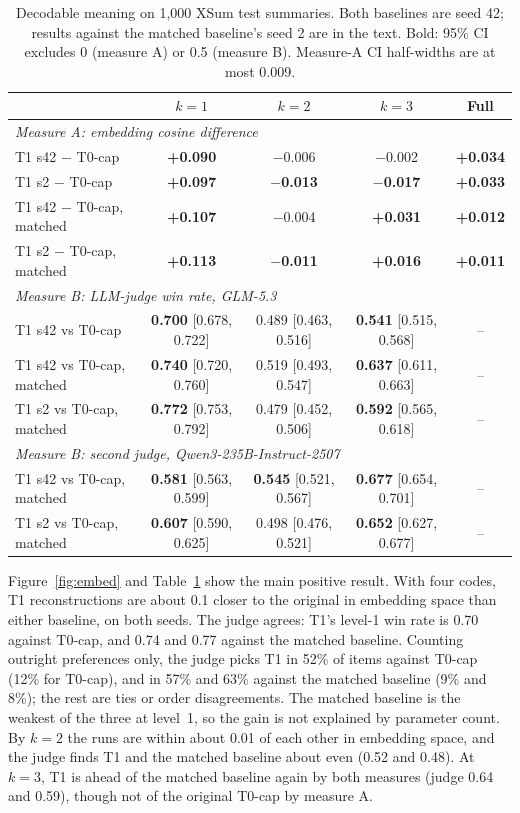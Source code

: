 \documentclass[11pt]{article}
\newcommand{\pos}[1]{\textbf{#1}}
\begin{document}
\begin{table}[t]
\centering
\footnotesize
\begin{tabular}{lcccc}
\toprule
& $k{=}1$ & $k{=}2$ & $k{=}3$ & Full \\
\midrule
\multicolumn{5}{l}{\emph{Measure A: embedding cosine difference}} \\
T1 s42 $-$ T0-cap & \pos{+0.090} & $-$0.006 & $-$0.002 & \pos{+0.034} \\
T1 s2 $-$ T0-cap & \pos{+0.097} & \pos{$-$0.013} & \pos{$-$0.017} & \pos{+0.033} \\
T1 s42 $-$ T0-cap, matched & \pos{+0.107} & $-$0.004 & \pos{+0.031} & \pos{+0.012} \\
T1 s2 $-$ T0-cap, matched & \pos{+0.113} & \pos{$-$0.011} & \pos{+0.016} & \pos{+0.011} \\
\midrule
\multicolumn{5}{l}{\emph{Measure B: LLM-judge win rate, GLM-5.3}} \\
T1 s42 vs T0-cap & \pos{0.700} [0.678, 0.722] & 0.489 [0.463, 0.516] & \pos{0.541} [0.515, 0.568] & -- \\
T1 s42 vs T0-cap, matched & \pos{0.740} [0.720, 0.760] & 0.519 [0.493, 0.547] & \pos{0.637} [0.611, 0.663] & -- \\
T1 s2 vs T0-cap, matched & \pos{0.772} [0.753, 0.792] & 0.479 [0.452, 0.506] & \pos{0.592} [0.565, 0.618] & -- \\
\midrule
\multicolumn{5}{l}{\emph{Measure B: second judge, Qwen3-235B-Instruct-2507}} \\
T1 s42 vs T0-cap, matched & \pos{0.581} [0.563, 0.599] & \pos{0.545} [0.521, 0.567] & \pos{0.677} [0.654, 0.701] & -- \\
T1 s2 vs T0-cap, matched & \pos{0.607} [0.590, 0.625] & 0.498 [0.476, 0.521] & \pos{0.652} [0.627, 0.677] & -- \\
\bottomrule
\end{tabular}
\caption{Decodable meaning on 1{,}000 XSum test summaries. Both baselines are seed 42; results against the matched baseline's seed 2 are in the text. Bold: 95\% CI excludes 0 (measure A) or 0.5 (measure B). Measure-A CI half-widths are at most 0.009.}
\label{tab:decode}
\end{table}

Figure~\ref{fig:embed} and Table~\ref{tab:decode} show the main positive result. With four codes, T1 reconstructions are about 0.1 closer to the original in embedding space than either baseline, on both seeds. The judge agrees: T1's level-1 win rate is 0.70 against T0-cap, and 0.74 and 0.77 against the matched baseline. Counting outright preferences only, the judge picks T1 in 52\% of items against T0-cap (12\% for T0-cap), and in 57\% and 63\% against the matched baseline (9\% and 8\%); the rest are ties or order disagreements. The matched baseline is the weakest of the three at level~1, so the gain is not explained by parameter count. By $k{=}2$ the runs are within about 0.01 of each other in embedding space, and the judge finds T1 and the matched baseline about even (0.52 and 0.48). At $k{=}3$, T1 is ahead of the matched baseline again by both measures (judge 0.64 and 0.59), though not of the original T0-cap by measure A.
\end{document}
